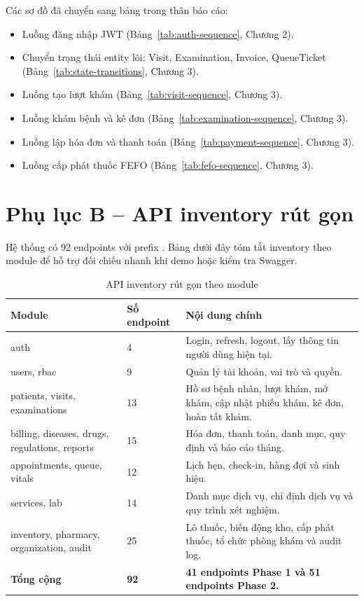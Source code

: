 Các sơ đồ đã chuyển sang bảng trong thân báo cáo:

\begin{itemize}
    \item Luồng đăng nhập JWT (Bảng~\ref{tab:auth-sequence}, Chương 2).
    \item Chuyển trạng thái entity lõi: Visit, Examination, Invoice, QueueTicket (Bảng~\ref{tab:state-transitions}, Chương 3).
    \item Luồng tạo lượt khám (Bảng~\ref{tab:visit-sequence}, Chương 3).
    \item Luồng khám bệnh và kê đơn (Bảng~\ref{tab:examination-sequence}, Chương 3).
    \item Luồng lập hóa đơn và thanh toán (Bảng~\ref{tab:payment-sequence}, Chương 3).
    \item Luồng cấp phát thuốc FEFO (Bảng~\ref{tab:fefo-sequence}, Chương 3).
\end{itemize}

\section{Phụ lục B -- API inventory rút gọn}

Hệ thống có 92 endpoints với prefix . Bảng dưới đây tóm tắt inventory theo module để hỗ trợ đối chiếu nhanh khi demo hoặc kiểm tra Swagger.

\begin{longtable}{|p{4cm}|p{2cm}|p{8cm}|}
\caption{API inventory rút gọn theo module}\\
\hline
\textbf{Module} & \textbf{Số endpoint} & \textbf{Nội dung chính} \\
\hline
auth & 4 & Login, refresh, logout, lấy thông tin người dùng hiện tại. \\
\hline
users, rbac & 9 & Quản lý tài khoản, vai trò và quyền. \\
\hline
patients, visits, examinations & 13 & Hồ sơ bệnh nhân, lượt khám, mở khám, cập nhật phiếu khám, kê đơn, hoàn tất khám. \\
\hline
billing, diseases, drugs, regulations, reports & 15 & Hóa đơn, thanh toán, danh mục, quy định và báo cáo tháng. \\
\hline
appointments, queue, vitals & 12 & Lịch hẹn, check-in, hàng đợi và sinh hiệu. \\
\hline
services, lab & 14 & Danh mục dịch vụ, chỉ định dịch vụ và quy trình xét nghiệm. \\
\hline
inventory, pharmacy, organization, audit & 25 & Lô thuốc, biến động kho, cấp phát thuốc, tổ chức phòng khám và audit log. \\
\hline
\textbf{Tổng cộng} & \textbf{92} & \textbf{41 endpoints Phase 1 và 51 endpoints Phase 2.} \\
\hline
\end{longtable}


